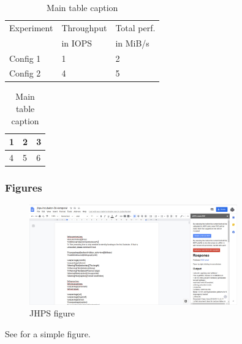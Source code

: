 \documentclass{jhps}
\begin{document}
\begin{table}
  \centering
  \begin{subtable}[t]{8cm}
  \centering
  \begin{tabular}{l|l|l}
         \rowcolor{tblhead} Experiment  & Throughput & Total perf.
  \\
         \rowcolor{tblhead}   & in IOPS & in MiB/s \\
       \hline
       \hline
   Config 1 & 1   &  2   \\
  \hline
   Config 2 & 4   &  5   \\
  \end{tabular}
  \caption{Caption 1}\label{tbl:1a}
  \end{subtable}
  \begin{subtable}[t]{3cm}
  \centering
  \begin{tabular}{|l|l|l|}
  \hline
   1   &  2   &  3  \\
  \hline
   4   &  5   &  6  \\
  \hline
  \end{tabular}
  \caption{Caption 2}\label{tbl:1b}
  \end{subtable}
  \caption{Main table caption}\label{tbl:1}
\end{table}

\subsubsection{Figures}

\begin{figure}   %
\includegraphics[width=0.8\textwidth]{jhps}
\caption{JHPS figure}
\label{fig:jhps}
\end{figure}

See  for a simple figure.
\end{document}
